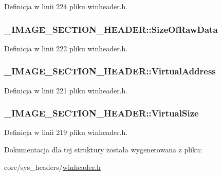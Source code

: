 Definicja w linii 224 pliku winheader.\-h.

\hypertarget{struct___i_m_a_g_e___s_e_c_t_i_o_n___h_e_a_d_e_r_a376d19b94bc4c71dc887ec7067e60025}{
\subsubsection[{Size\-Of\-Raw\-Data}]{ \-\_\-\-I\-M\-A\-G\-E\-\_\-\-S\-E\-C\-T\-I\-O\-N\-\_\-\-H\-E\-A\-D\-E\-R\-::\-Size\-Of\-Raw\-Data}}\label{struct___i_m_a_g_e___s_e_c_t_i_o_n___h_e_a_d_e_r_a376d19b94bc4c71dc887ec7067e60025}


Definicja w linii 222 pliku winheader.\-h.

\hypertarget{struct___i_m_a_g_e___s_e_c_t_i_o_n___h_e_a_d_e_r_ab0f0e24d6b0a17680e8609a608a0d530}{
\subsubsection[{Virtual\-Address}]{ \-\_\-\-I\-M\-A\-G\-E\-\_\-\-S\-E\-C\-T\-I\-O\-N\-\_\-\-H\-E\-A\-D\-E\-R\-::\-Virtual\-Address}}\label{struct___i_m_a_g_e___s_e_c_t_i_o_n___h_e_a_d_e_r_ab0f0e24d6b0a17680e8609a608a0d530}


Definicja w linii 221 pliku winheader.\-h.

\hypertarget{struct___i_m_a_g_e___s_e_c_t_i_o_n___h_e_a_d_e_r_ae141e4583b36e2ea9b564b420e7e7c49}{
\subsubsection[{Virtual\-Size}]{ \-\_\-\-I\-M\-A\-G\-E\-\_\-\-S\-E\-C\-T\-I\-O\-N\-\_\-\-H\-E\-A\-D\-E\-R\-::\-Virtual\-Size}}\label{struct___i_m_a_g_e___s_e_c_t_i_o_n___h_e_a_d_e_r_ae141e4583b36e2ea9b564b420e7e7c49}


Definicja w linii 219 pliku winheader.\-h.



Dokumentacja dla tej struktury została wygenerowana z pliku\-:\begin{DoxyCompactItemize}
\item 
core/sys\-\_\-headers/\hyperlink{winheader_8h}{winheader.\-h}\end{DoxyCompactItemize}
